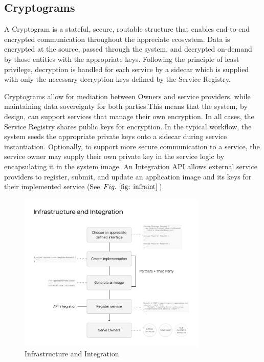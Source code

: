 \documentclass[a4paper,onecolumn, 10.5pt]{article}
\begin{document}
\subsection{Cryptograms}
A Cryptogram is a stateful, secure, routable structure that enables end-to-end encrypted communication throughout the appreciate ecosystem. Data is encrypted at the source, passed through the system, and decrypted on-demand by those entities with the appropriate keys. Following the principle of least privilege, decryption is handled for each service by a sidecar which is supplied with only the necessary decryption keys defined by the Service Registry.

Cryptograms allow for mediation between Owners and service providers, while maintaining data sovereignty for both parties.This means that the system, by design, can support services that manage their own encryption. In all cases, the Service Registry shares public keys for encryption. In the typical workflow, the system seeds the appropriate private keys onto a sidecar during service instantiation. Optionally, to support more secure communication to a service, the service owner may supply their own private key in the service logic by encapsulating it in the system image. An Integration API allows external service providers to register, submit, and update an application image and its keys for their implemented service (See \(Fig.~\ref{fig: infraint}\)).

\begin{figure}[!htb]
	\centering %
		\includegraphics[clip, trim=0cm 2cm 0cm 5cm, width=0.80\textwidth]{./images/Infrasctructure_and_integration.pdf}
	\caption{Infrastructure and Integration}
	\label{fig: infraint}
\end{figure}
\end{document}
